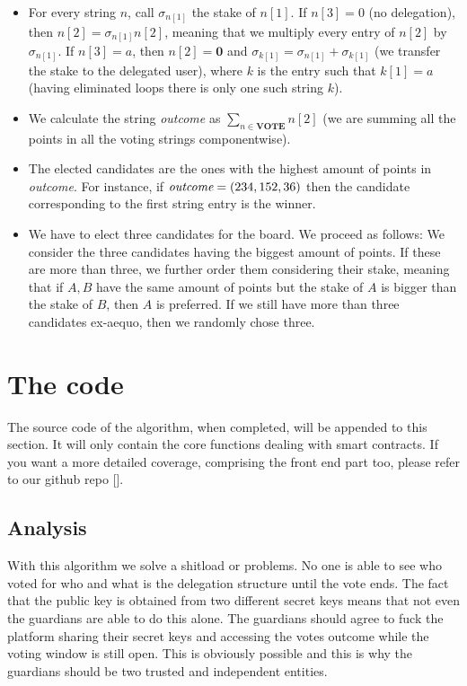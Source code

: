 \documentclass[submission, copyright,creativecommons,sharealike,noncommercial]{eptcs}
\begin{document}
\begin{itemize}
\begin{itemize}
\begin{itemize}
						\item For every string $n$, call $\sigma_{n[1]}$ the stake of $n[1]$. If $n[3] = 0$ (no delegation), then $n[2] = \sigma_{n[1]} n[2]$, meaning that we multiply every entry of $n[2]$ by $\sigma_{n[1]}$. If $n[3] = a$, then $n[2] = \mathbf{0}$ and $\sigma_{k[1]} = \sigma_{n[1]} + \sigma_{k[1]}$ (we transfer the stake to the delegated user), where $k$ is the entry such that $k[1] = a$ (having eliminated loops there is only one such string $k$).
						
						
						\item We calculate the string \emph{outcome} as $\sum_{n \in \textbf{VOTE}} n[2]$ (we are summing all the points in all the voting strings componentwise).
						
						\item The elected candidates are the ones with the highest amount of points in \emph{outcome}. For instance, if $\emph{outcome} = (234, 152, 36)$ then the candidate corresponding to the first string entry is the winner.
						
						\item We have to elect three candidates for the board. We proceed as follows: We consider the three candidates having the biggest amount of points. If these are more than three, we further order them considering their stake, meaning that if $A,B$ have the same amount of points but the stake of $A$ is bigger than the stake of $B$, then $A$ is preferred. If we still have more than three candidates ex-aequo, then we randomly chose three.
					\end{itemize}
				\end{itemize}
			\end{itemize}

\section{The code}
	The source code of the algorithm, when completed, will be appended to this section. It will only contain the core functions dealing with smart contracts. If you want a more detailed coverage, comprising the front end part too, please refer to our github repo [].


	\subsection{Analysis}
		With this algorithm we solve a shitload or problems. No one is able to see who voted for who and what is the delegation structure until the vote ends. The fact that the public key is obtained from two different secret keys means that not even the guardians are able to do this alone. The guardians should agree to fuck the platform sharing their secret keys and accessing the votes outcome while the voting window is still open. This is obviously possible and this is why the guardians should be two trusted and independent entities.
		
\end{document}
